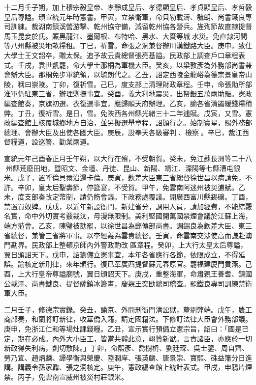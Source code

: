 \begin{pinyinscope}
十二月壬子朔，加上穆宗毅皇帝、孝靜成皇后、孝德顯皇后、孝貞顯皇后、孝哲毅皇后尊謚。頒宣統元年時憲書。甲寅，立禁衛軍，命貝勒載濤、毓朗、尚書鐵良專司訓練。裁湖南鎮溪營游擊、乾州協守備，減留乾州協各營兵。旌殉節故直隸提督馬玉昆妾於氏。賑黑龍江、墨爾根、布特哈、黑水、大賚等城水災。免直隸河間等八州縣被災地畝糧租。丁巳，祈雪。命張之洞兼督辦川漢鐵路大臣。庚申，致仕大學士王文韶卒，贈太保。追予故云貴總督張亮基謚。民政部上調查戶口章程表式。壬戌，袁世凱罷，命大學士那桐為軍機大臣。癸亥，以梁敦彥為外務部尚書兼會辦大臣。那桐免步軍統領，以毓朗代之。乙丑，詔定西陵金龍峪為德宗景皇帝山陵，稱曰崇陵。丁卯，復祈雪。己巳，度支部上清理財政章程。壬申，命張勛所部淮軍仍駐東三省，辦理剿撫事宜。癸酉，義大利地震災，出帑銀五萬兩助賑。憲政編查館奏，京旗初選、衣復選事宜，應歸順天府辦理。乙亥，諭各省清蠲緩錢糧積弊。丁丑，復祈雪。是日，雪。免陜西各州縣光緒三十二年逋賦。戊寅，又雪。憲政編查館上核覆城鄉地方自治，並另擬選舉章程，詔頒行之。始制寶星，賜外務部總理、會辦大臣及出使各國大臣。庚辰，設奉天各級審判、檢察。辛巳，裁江西督糧道，設巡警、勸業兩道。

宣統元年己酉春正月壬午朔，以大行在殯，不受朝賀。癸未，免江蘇長洲等二十八州縣荒廢田地，暨昭文、金壇、丹徒、昆山、新陽、靖江、溧陽等七縣漕屯銀米。戊子，置呼倫貝爾沿邊卡倫。庚寅，欽差大臣東三省總督徐世昌以病請免，不許。辛卯，皇太后聖壽節，停筵宴，不受賀。甲午，免雲南阿迷州被災逋賦。乙未，度支部奏改定幣制，請仍飭會議。下政務處覆議。開廣西富川縣錫礦。丁酉，禁置買奴婢。戊戌，以近年新設衙門，新建省分，調用人員，請加經費，不能綜覈名實，命中外切實考覈裁汰，毋漫無限制。美利堅國開萬國禁煙會議於江蘇上海，端方蒞會。乙亥，陳璧被劾罷，以徐世昌為郵傳部尚書。調錫良為欽差大臣、東三省總督，兼管三省將軍事。以李經羲為雲貴總督。壬寅，命雲南交涉使高而謙赴澳門勘界。民政部上整頓京師內外警政酌改區章程。癸卯，上大行太皇太后尊謚，翼日頒詔天下。戊申，詔籌備立憲事宜，本年各省應行各節，依限成立，不得延誤。諭核定新刑律，來年頒行。復已革廣西提督蘇元春原官。罷福建廈門貢燕。己酉，上大行皇帝尊謚廟號，翼日頒詔天下。庚戌，重整海軍，命肅親王善耆、鎮國公載澤、尚書鐵良、提督薩鎮冰籌畫，慶親王奕劻總司稽查。罷鐵良專司訓練禁衛軍大臣。

二月壬子，修德宗實錄。癸丑，諭京、外問刑衙門清訟獄，釐剔弊端。戊午，農工商部奏，和蘭將訂新律，收華僑入籍，請定國籍法。下修訂法律大臣會外務部議。庚申，免浙江仁和等場灶課錢糧。乙丑，宣示實行預備立憲宗旨，詔曰：「國是已定，期在必成。內外大小臣工，皆當共體此意，翊贊新猷。言責諸臣，亦應於一切新政得失利病，剴切敷陳。」丁卯，命熙彥、喬樹枬、劉廷琛、吳士鑒、周自齊、勞乃宣、趙炳麟、譚學衡與榮慶、陸潤庠、張英麟、唐景崇、寶熙、硃益籓分日進講。講義令孫家鼐、張之洞核定。庚午，憲政編查館上統計表式。甲戌，申鴉片煙禁。丙子，免雲南宣威州被災村莊銀米。


\end{pinyinscope}
